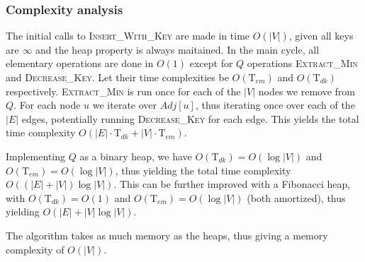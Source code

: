 \documentclass{report}[a4paper]
\theoremstyle{remark}
\begin{document}
\subsubsection{Complexity analysis}
The initial calls to \textsc{Insert\_With\_Key} are made in time $O(|V|)$, given all keys are $\infty$ and the heap property is always maitained. In the main cycle, all elementary operations are done in $O(1)$ except for $Q$ operations \textsc{Extract\_Min} and \textsc{Decrease\_Key}. Let their time complexities be $O(\text{T}_{em})$ and $O(\text{T}_{dk})$ respectively. \textsc{Extract\_Min} is run once for each of the $|V|$ nodes we remove from $Q$. For each node $u$ we iterate over $Adj[u]$, thus iterating once over each of the $|E|$ edges, potentially running \textsc{Decrease\_Key} for each edge. This yields the total time complexity $O(|E|\cdot \text{T}_{dk}+|V|\cdot \text{T}_{em})$. \par
Implementing $Q$ as a binary heap, we have $O(\text{T}_{dk})=O(\log |V|)$ and $O(\text{T}_{em})=O(\log |V|)$, thus yielding the total time complexity $O((|E|+|V|)\log |V|)$. This can be further improved with a Fibonacci heap, with $O(\text{T}_{dk})=O(1)$ and $O(\text{T}_{em})=O(\log |V|)$ (both amortized), thus yielding $O(|E| + |V|\log |V|)$.\par
The algorithm takes as much memory as the heaps, thus giving a memory complexity of $O(|V|)$.
\end{document}
